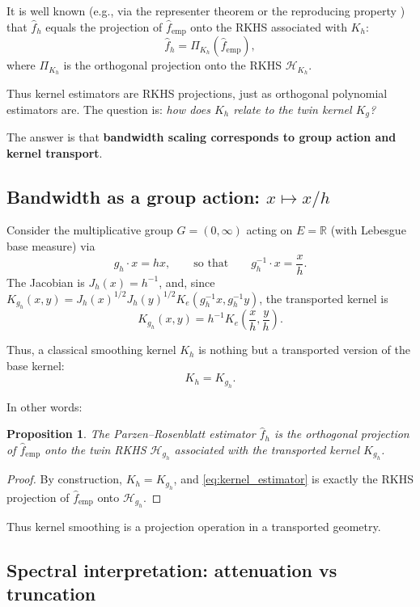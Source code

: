 \documentclass[11pt,a4paper]{article}
\newtheorem{proposition}[theorem]{Proposition}
\newcommand{\R}{\mathbb{R}}
\newcommand{\RKHS}{\mathcal{H}}
\begin{document}
It is well known (e.g., via the representer theorem or the reproducing property \citep{Wahba1990,Berlinet2004}) that $\hat{f}_h$ equals the projection of $\hat{f}_{\mathrm{emp}}$ onto the RKHS associated with $K_h$:
\[
\hat{f}_h = \Pi_{K_h}(\hat{f}_{\mathrm{emp}}),
\]
where $\Pi_{K_h}$ is the orthogonal projection onto the RKHS $\RKHS_{K_h}$.

Thus kernel estimators are RKHS projections, just as orthogonal polynomial estimators are. The question is: \emph{how does $K_h$ relate to the twin kernel $K_g$?}

The answer is that \textbf{bandwidth scaling corresponds to group action and kernel transport}.

\subsection{Bandwidth as a group action: $x \mapsto x/h$}

Consider the multiplicative group $G = (0, \infty)$ acting on $E = \R$ (with Lebesgue base measure) via
\[
g_h \cdot x = h x, \qquad\text{so that}\qquad g_h^{-1}\cdot x = \frac{x}{h}.
\]
The Jacobian is $J_h(x) = h^{-1}$, and, since $K_{g_h}(x,y)=J_h(x)^{1/2}J_h(y)^{1/2}K_e(g_h^{-1}x,g_h^{-1}y)$, the transported kernel is
\[
K_{g_h}(x, y) = h^{-1} K_e\left(\frac{x}{h}, \frac{y}{h}\right).
\]

Thus, a classical smoothing kernel $K_h$ is nothing but a transported version of the base kernel:
\[
K_h = K_{g_h}.
\]

In other words:
\begin{center}
\end{center}

\begin{proposition}\label{prop:parzen}
The Parzen--Rosenblatt estimator $\hat{f}_h$ is the orthogonal projection of $\hat{f}_{\mathrm{emp}}$ onto the twin RKHS $\RKHS_{g_h}$ associated with the transported kernel $K_{g_h}$.
\end{proposition}

\begin{proof}
By construction, $K_h = K_{g_h}$, and \eqref{eq:kernel_estimator} is exactly the RKHS projection of $\hat{f}_{\mathrm{emp}}$ onto $\RKHS_{g_h}$.
\end{proof}

Thus kernel smoothing is a projection operation in a transported geometry.

\subsection{Spectral interpretation: attenuation vs truncation}
\end{document}
